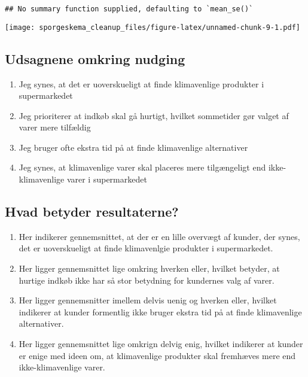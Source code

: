 \documentclass[
]{article}
\begin{document}
\begin{verbatim}
## No summary function supplied, defaulting to `mean_se()`
\end{verbatim}

\texttt{[image: sporgeskema\_cleanup\_files/figure-latex/unnamed-chunk-9-1.pdf]}

\hypertarget{udsagnene-omkring-nudging}{%
\subsection{Udsagnene omkring nudging}\label{udsagnene-omkring-nudging}}

\begin{enumerate}
\def\labelenumi{\arabic{enumi}.}
\item
  Jeg synes, at det er uoverskueligt at finde klimavenlige produkter i
  supermarkedet
\item
  Jeg prioriterer at indkøb skal gå hurtigt, hvilket sommetider gør
  valget af varer mere tilfældig
\item
  Jeg bruger ofte ekstra tid på at finde klimavenlige alternativer
\item
  Jeg synes, at klimavenlige varer skal placeres mere tilgængeligt end
  ikke-klimavenlige varer i supermarkedet
\end{enumerate}

\hypertarget{hvad-betyder-resultaterne-3}{%
\subsection{Hvad betyder
resultaterne?}\label{hvad-betyder-resultaterne-3}}

\begin{enumerate}
\def\labelenumi{\arabic{enumi}.}
\item
  Her indikerer gennemsnittet, at der er en lille overvægt af kunder,
  der synes, det er uoverskueligt at finde klimavenlgie produkter i
  supermarkedet.
\item
  Her ligger gennemsnittet lige omkring hverken eller, hvilket betyder,
  at hurtige indkøb ikke har så stor betydning for kundernes valg af
  varer.
\item
  Her ligger gennemsnitter imellem delvis uenig og hverken eller,
  hvilket indikerer at kunder formentlig ikke bruger ekstra tid på at
  finde klimavenlige alternativer.
\item
  Her ligger gennemsnittet lige omkrign delvig enig, hvilket indikerer
  at kunder er enige med ideen om, at klimavenlige produkter skal
  fremhæves mere end ikke-klimavenlige varer.
\end{enumerate}
\end{document}
